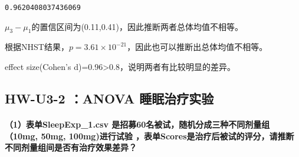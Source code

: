 \documentclass[11pt]{article}
\makeatletter
\newcommand{\boxspacing}{\kern\kvtcb@left@rule\kern\kvtcb@boxsep}
\newcommand{\prompt}[4]{
        \ttfamily\llap{{\color{#2}[#3]:\hspace{3pt}#4}}\vspace{-\baselineskip}
    }
\makeatother
\begin{document}
            \begin{tcolorbox}[breakable, size=fbox, boxrule=.5pt, pad at break*=1mm, opacityfill=0]
\prompt{Out}{outcolor}{8}{\boxspacing}
\begin{Verbatim}[commandchars=\\\{\}]
0.9620408037436069
\end{Verbatim}
\end{tcolorbox}
        
    \(\mu_3-\mu_1\)的置信区间为(0.11,0.41)，因此推断两者总体均值不相等。

根据NHST结果，\(p=3.61\times10^{-21}\)，因此也可以推断出总体均值不相等。

effect size(Cohen's d)=0.96\textgreater{}0.8，说明两者有比较明显的差异。

    \hypertarget{hw-u3-2-anova-ux7761ux7720ux6cbbux7597ux5b9eux9a8c}{%
\subsection{HW-U3-2 ：ANOVA
睡眠治疗实验}\label{hw-u3-2-anova-ux7761ux7720ux6cbbux7597ux5b9eux9a8c}}

    \hypertarget{ux8868ux5355sleepexp_1.csv-ux662fux62dbux52df60ux540dux88abux8bd5ux968fux673aux5206ux6210ux4e09ux79cdux4e0dux540cux5242ux91cfux7ec410mg-50mg-100mgux8fdbux884cux8bd5ux9a8c-ux8868ux5355scoresux662fux6cbbux7597ux540eux88abux8bd5ux7684ux8bc4ux5206ux8bf7ux63a8ux65adux4e0dux540cux5242ux91cfux7ec4ux95f4ux662fux5426ux6709ux6cbbux7597ux6548ux679cux5deeux5f02}{%
\paragraph{（1）表单SleepExp\_1.csv
是招募60名被试，随机分成三种不同剂量组（10mg, 50mg, 100mg)进行试验
，表单Scores是治疗后被试的评分，请推断不同剂量组间是否有治疗效果差异？}\label{ux8868ux5355sleepexp_1.csv-ux662fux62dbux52df60ux540dux88abux8bd5ux968fux673aux5206ux6210ux4e09ux79cdux4e0dux540cux5242ux91cfux7ec410mg-50mg-100mgux8fdbux884cux8bd5ux9a8c-ux8868ux5355scoresux662fux6cbbux7597ux540eux88abux8bd5ux7684ux8bc4ux5206ux8bf7ux63a8ux65adux4e0dux540cux5242ux91cfux7ec4ux95f4ux662fux5426ux6709ux6cbbux7597ux6548ux679cux5deeux5f02}}
\end{document}
